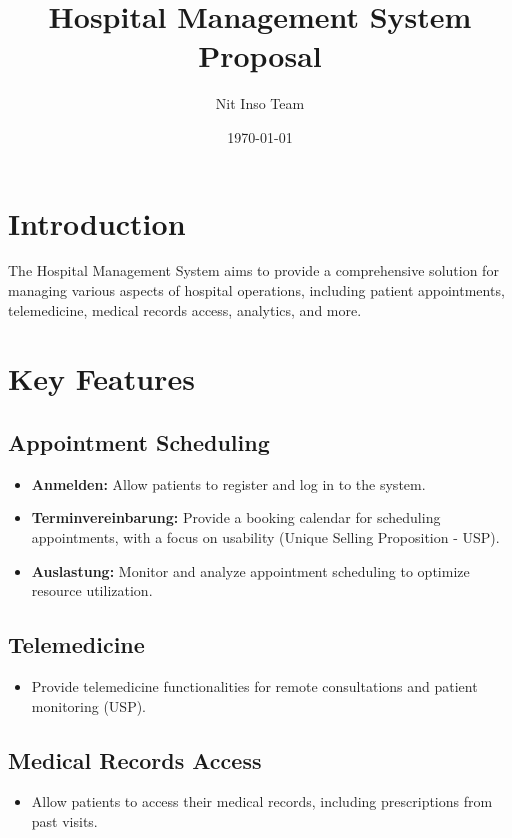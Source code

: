 \documentclass{article}
\title{Hospital Management System Proposal}
\author{Nit Inso Team}
\date{\today}
\begin{document}
\maketitle

\section{Introduction}
The Hospital Management System aims to provide a comprehensive solution for managing various aspects of hospital operations, including patient appointments, telemedicine, medical records access, analytics, and more.

\section{Key Features}
\subsection{Appointment Scheduling}
\begin{itemize}
    \item \textbf{Anmelden:} Allow patients to register and log in to the system.
    \item \textbf{Terminvereinbarung:} Provide a booking calendar for scheduling appointments, with a focus on usability (Unique Selling Proposition - USP).
    \item \textbf{Auslastung:} Monitor and analyze appointment scheduling to optimize resource utilization.
\end{itemize}

\subsection{Telemedicine}
\begin{itemize}
    \item Provide telemedicine functionalities for remote consultations and patient monitoring (USP).
\end{itemize}

\subsection{Medical Records Access}
\begin{itemize}
    \item Allow patients to access their medical records, including prescriptions from past visits.
\end{itemize}
\end{document}
